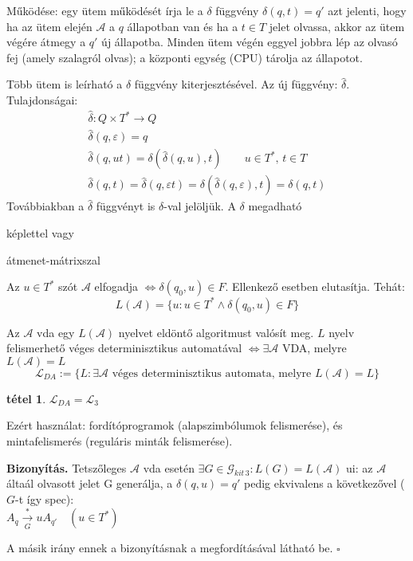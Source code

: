 \documentclass[fleqn,10pt,a4paper]{article}
\newcommand{\ob}{\hfill$\square$}
\renewcommand{\epsilon}{\varepsilon}
\theoremstyle{magyar}
\newtheorem{te}{tétel}[section]
\newenvironment{biz}{\begin{trivlist}\item\relax\mbox{\textbf{Bizonyítás.\enskip}}\ignorespaces}{\ob\end{trivlist}}
\newcommand{\Lang}{\mathcal{L}}
\newcommand{\Nytan}{\mathcal{G}}
\newcommand{\A}{\mathcal{A}}
\newcommand{\VDA}{\A}
\begin{document}
  Működése: egy ütem működését írja le a $\delta$ függvény $\delta(q,t) = q'$ azt jelenti, hogy ha az ütem elején
  $\VDA$ a $q$ állapotban van és ha a $t\in T$ jelet olvassa, akkor az ütem végére átmegy a $q'$ új állapotba. Minden
  ütem végén eggyel jobbra lép az olvasó fej (amely szalagról olvas); a központi egység (CPU) tárolja az állapotot.
  
  Több ütem is leírható a $\delta$ függvény kiterjesztésével. Az új függvény: $\hat{\delta}$. Tulajdonságai:
  \begin{gather*}
    \hat{\delta}\colon Q\times T^* \to Q\\
    \hat{\delta}(q,\epsilon) = q\\
    \hat{\delta}(q, ut) = \delta(\hat{\delta}(q,u),t)\qquad u\in T^*,\, t\in T\\
    \hat{\delta}(q,t) = \hat{\delta}(q,\epsilon t) = \delta(\hat{\delta}(q,\epsilon),t) = \delta(q,t)
  \end{gather*}
  Továbbiakban a $\hat{\delta}$ függvényt is $\delta$-val jelöljük. A $\delta$ megadható
  \begin{inparaenum}[\itshape a)]
  \item képlettel vagy
  \item átmenet-mátrixszal
  \end{inparaenum}
  
  Az $u\in T^*$ szót $\VDA$ elfogadja $\iff \delta(q_0,u) \in F$. Ellenkező esetben elutasítja. Tehát:
  \[ L(\VDA) = \{ u : u\in T^* \land \delta(q_0, u) \in F \}\]
  
  Az $\VDA$ vda egy $L(\VDA)$ nyelvet eldöntő algoritmust valósít meg.
  $L$ nyelv felismerhető véges determinisztikus automatával $\iff \exists \VDA$ VDA, melyre $L(\VDA) = L$
  \[ \Lang_{DA} := \{ L : \exists \VDA \text{ véges determinisztikus automata, melyre } L(\VDA) = L \}\]
  
  
  
  \begin{te} $\Lang_{DA} = \Lang_3$
  \end{te}
  
  Ezért használat: fordítóprogramok (alapszimbólumok felismerése), és mintafelismerés (reguláris minták felismerése).
  
  \begin{biz} Tetszőleges $\VDA$ vda esetén $\exists G\in \Nytan_{kit\,3}\colon L(G)= L(\VDA)$ ui: az $\VDA$ áltaál
    olvasott jelet G generálja, a $\delta(q,u) = q'$ pedig ekvivalens a következővel ($G$-t így spec):\\
    $A_q\xrightarrow[G]{*} uA_{q'} \quad (u\in T^*)$  
    
    A másik irány ennek a bizonyításnak a megfordításával látható be.
  \end{biz}
  
\end{document}
